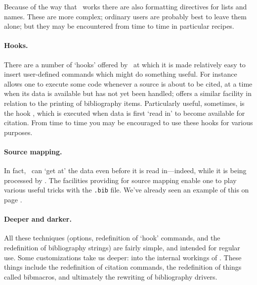 Because of the way that \biblatex\ works there are also formatting
directives for lists and
names.
These are more complex; ordinary users are probably best to leave them
alone; but they may be encountered from time to time in particular recipes.

\paragraph{Hooks.} There are a number
of `hooks' offered by \biblatex\ at which it is made relatively easy
to insert user-defined commands which might do something useful. For
instance  allows one to
execute some code whenever a source is about to be cited, at a time
when its data is available but has not yet been handled;
 offers a similar facility
in relation to the printing of bibliography items. Particularly
useful, sometimes, is the hook ,
which is executed when data is first `read in' to become available for
citation. From time to time you may be encouraged to use these hooks
for various purposes.

\paragraph{Source mapping.} In fact,
\biblatex\ can `get at' the data even before it is read in---indeed,
while it is being processed by . The facilities
providing for source mapping enable one to play various useful tricks
with the \verb|.bib| file. We've already seen an example of this on
page \pageref{datamap}.

\paragraph{Deeper and darker.}
All these techniques (options, redefinition of `hook' commands, and
the redefinition of bibliography strings) are fairly simple, and
intended for regular use. Some customizations take us deeper: into the
internal workings of \biblatex. These things include the redefinition
of citation commands, the redefinition of things called bibmacros, and
ultimately the rewriting of bibliography drivers.

